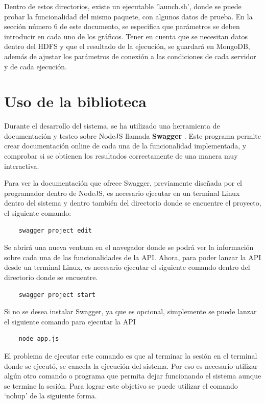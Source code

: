 Dentro de estos directorios, existe un ejecutable 'launch.sh', donde se puede probar la funcionalidad del mismo paquete, con algunos datos de prueba. En la sección número 6 de este documento, se especifica que parámetros se deben introducir en cada uno de los gráficos. Tener en cuenta que se necesitan datos dentro del HDFS y que el resultado de la ejecución, se guardará en MongoDB, además de ajustar los parámetros de conexión a las condiciones de cada servidor y de cada ejecución.

\section{Uso de la biblioteca}

Durante el desarrollo del sistema, se ha utilizado una herramienta de documentación y testeo sobre NodeJS llamada \textbf{Swagger} \cite{SwaggerInicial}. Este programa permite crear documentación online de cada una de la funcionalidad implementada, y comprobar si se obtienen los resultados correctamente de una manera muy interactiva.

Para ver la documentación que ofrece Swagger, previamente diseñada por el programador dentro de NodeJS, es necesario ejecutar en un terminal Linux dentro del sistema y dentro también del directorio donde se encuentre el proyecto, el siguiente comando:

\begin{verbatim}
	swagger project edit
\end{verbatim}

Se abrirá una nueva ventana en el navegador donde se podrá ver la información sobre cada una de las funcionalidades de la API. Ahora, para poder lanzar la API desde un terminal Linux, es necesario ejecutar el siguiente comando dentro del directorio donde se encuentre.

\begin{verbatim}
	swagger project start
\end{verbatim}

Si no se desea instalar Swagger, ya que es opcional, simplemente se puede lanzar el siguiente comando para ejecutar la API 

\begin{verbatim}
	node app.js
\end{verbatim}

El problema de ejecutar este comando es que al terminar la sesión en el terminal donde se ejecutó, se cancela la ejecución del sistema. Por eso es necesario utilizar algún otro comando o programa que permita dejar funcionando el sistema aunque se termine la sesión. Para lograr este objetivo se puede utilizar el comando ‘nohup’ de la siguiente forma.

